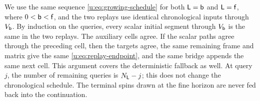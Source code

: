 We use the same sequence \eqref{u:eq:growing-schedule} for both
$\mathsf{L}=\mathsf{b}$ and $\mathsf{L}=\mathsf{f}$, where $0<\mathsf{b}<\mathsf{f}$,
and the two replays use identical chronological inputs through
$V_{\mathsf{b}}$. By induction on the queries, every scalar
initial segment through $V_{\mathsf{b}}$ is the same in the two replays. The auxiliary cells agree. If the scalar paths agree through
the preceding cell, then the targets agree, the same remaining frame
and matrix give the same \eqref{u:eq:replay-endpoint}, and the same
bridge appends the same next cell. This argument covers the
deterministic fallback as well. At query $j$, the number of remaining queries
is $N_{\mathsf{L}}-j$; this does not change the chronological schedule.
The terminal spins drawn at the fine horizon are never fed back into
the continuation.
